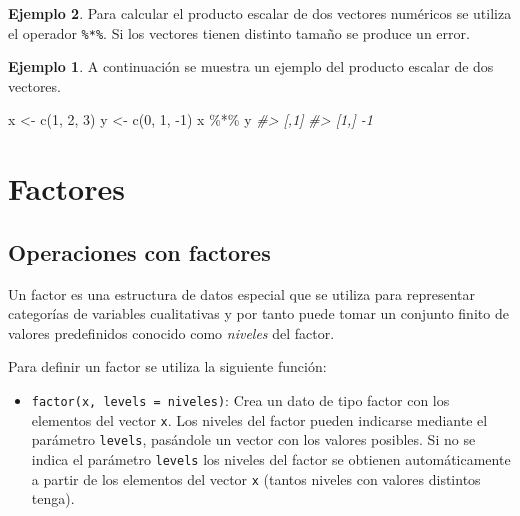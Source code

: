 \documentclass[
]{book}
\newenvironment{Shaded}{\begin{snugshade}}{\end{snugshade}}
\newcommand{\CommentTok}[1]{\textcolor[rgb]{0.56,0.35,0.01}{\textit{#1}}}
\newcommand{\DecValTok}[1]{\textcolor[rgb]{0.00,0.00,0.81}{#1}}
\newcommand{\FunctionTok}[1]{\textcolor[rgb]{0.00,0.00,0.00}{#1}}
\newcommand{\NormalTok}[1]{#1}
\newcommand{\OtherTok}[1]{\textcolor[rgb]{0.56,0.35,0.01}{#1}}
\newcommand{\SpecialCharTok}[1]{\textcolor[rgb]{0.00,0.00,0.00}{#1}}
\providecommand{\tightlist}{%
  \setlength{\itemsep}{0pt}\setlength{\parskip}{0pt}}
\theoremstyle{definition}
\theoremstyle{definition}
\newtheorem{example}{Ejemplo}[chapter]
\theoremstyle{definition}
\theoremstyle{definition}
\theoremstyle{remark}
\begin{document}
\begin{example}
Para calcular el producto escalar de dos vectores numéricos se utiliza el operador \texttt{\%*\%}. Si los vectores tienen distinto tamaño se produce un error.

\begin{example}

A continuación se muestra un ejemplo del producto escalar de dos vectores.

\begin{Shaded}
\begin{Highlighting}[]
\NormalTok{x }\OtherTok{\textless{}{-}} \FunctionTok{c}\NormalTok{(}\DecValTok{1}\NormalTok{, }\DecValTok{2}\NormalTok{, }\DecValTok{3}\NormalTok{)}
\NormalTok{y }\OtherTok{\textless{}{-}} \FunctionTok{c}\NormalTok{(}\DecValTok{0}\NormalTok{, }\DecValTok{1}\NormalTok{, }\SpecialCharTok{{-}}\DecValTok{1}\NormalTok{)}
\NormalTok{x }\SpecialCharTok{\%*\%}\NormalTok{ y}
\CommentTok{\#\textgreater{}      [,1]}
\CommentTok{\#\textgreater{} [1,]   {-}1}
\end{Highlighting}
\end{Shaded}

\end{example}

\hypertarget{factores}{%
\section{Factores}\label{factores}}

\hypertarget{operaciones-con-factores}{%
\subsection{Operaciones con factores}\label{operaciones-con-factores}}

Un factor es una estructura de datos especial que se utiliza para representar categorías de variables cualitativas y por tanto puede tomar un conjunto finito de valores predefinidos conocido como \emph{niveles} del factor.

Para definir un factor se utiliza la siguiente función:

\begin{itemize}
\tightlist
\item
  \texttt{factor(x,\ levels\ =\ niveles)}: Crea un dato de tipo factor con los elementos del vector \texttt{x}. Los niveles del factor pueden indicarse mediante el parámetro \texttt{levels}, pasándole un vector con los valores posibles. Si no se indica el parámetro \texttt{levels} los niveles del factor se obtienen automáticamente a partir de los elementos del vector \texttt{x} (tantos niveles con valores distintos tenga).
\end{itemize}


\end{example}
\end{document}
